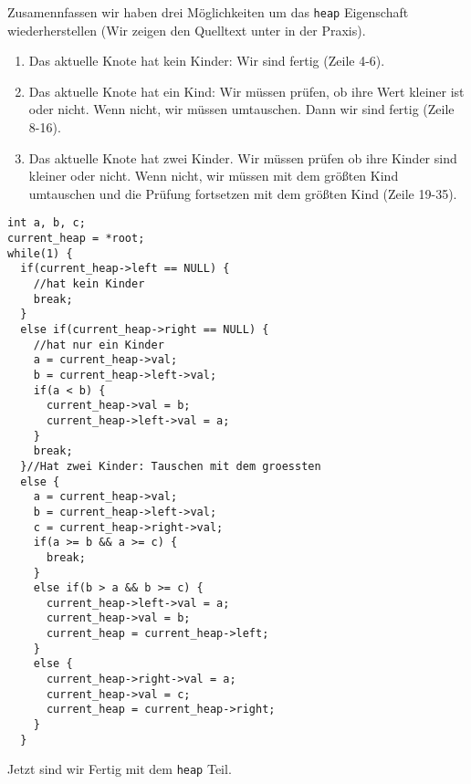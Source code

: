 Zusamennfassen wir haben drei Möglichkeiten um das \texttt{heap} Eigenschaft wiederherstellen
(Wir zeigen den Quelltext unter in der Praxis).
\begin{enumerate}
\item Das aktuelle Knote hat kein Kinder: Wir sind fertig (Zeile 4-6).
\item Das aktuelle Knote hat ein Kind: Wir müssen prüfen, ob ihre Wert kleiner ist oder nicht.
Wenn nicht, wir müssen umtauschen. Dann wir sind fertig (Zeile 8-16).
\item Das aktuelle Knote hat zwei Kinder. Wir müssen prüfen ob ihre Kinder sind kleiner oder nicht.
Wenn nicht, wir müssen mit dem größten Kind umtauschen und die Prüfung fortsetzen mit dem größten Kind (Zeile 19-35).
\end{enumerate}
\begin{lstlisting}
int a, b, c;
current_heap = *root;
while(1) {
  if(current_heap->left == NULL) {
    //hat kein Kinder
    break;
  }
  else if(current_heap->right == NULL) {
    //hat nur ein Kinder
    a = current_heap->val;
    b = current_heap->left->val;
    if(a < b) {
      current_heap->val = b;
      current_heap->left->val = a;
    }
    break;
  }//Hat zwei Kinder: Tauschen mit dem groessten
  else {
    a = current_heap->val;
    b = current_heap->left->val;
    c = current_heap->right->val;
    if(a >= b && a >= c) {
      break;
    }
    else if(b > a && b >= c) {
      current_heap->left->val = a;
      current_heap->val = b;
      current_heap = current_heap->left;
    }
    else {
      current_heap->right->val = a;
      current_heap->val = c;
      current_heap = current_heap->right;
    }
  }
\end{lstlisting}
Jetzt sind wir Fertig mit dem \texttt{heap} Teil.

